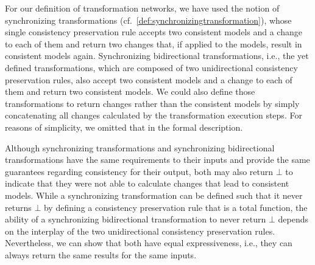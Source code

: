 For our definition of transformation networks, we have used the notion of synchronizing transformations (cf.~\autoref{def:synchronizingtransformation}), whose single consistency preservation rule accepts two consistent models and a change to each of them and return two changes that, if applied to the models, result in consistent models again.
Synchronizing bidirectional transformations, i.e., the yet defined transformations, which are composed of two unidirectional consistency preservation rules, also accept two consistent models and a change to each of them and return two consistent models.
We could also define those transformations to return changes rather than the consistent models by simply concatenating all changes calculated by the transformation execution steps.
For reasons of simplicity, we omitted that in the formal description.

Although synchronizing transformations and synchronizing bidirectional transformations have the same requirements to their inputs and provide the same guarantees regarding consistency for their output, both may also return $\bot$ to indicate that they were not able to calculate changes that lead to consistent models.
While a synchronizing transformation can be defined such that it never returns $\bot$ by defining a consistency preservation rule that is a total function, the ability of a synchronizing bidirectional transformation to never return $\bot$ depends on the interplay of the two unidirectional consistency preservation rules.
Nevertheless, we can show that both have equal expressiveness, i.e., they can always return the same results for the same inputs.


